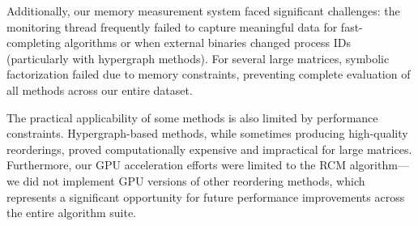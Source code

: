 Additionally, our memory measurement system faced significant challenges: the monitoring thread frequently failed to capture meaningful data for fast-completing algorithms or when external binaries changed process IDs (particularly with hypergraph methods). For several large matrices, symbolic factorization failed due to memory constraints, preventing complete evaluation of all methods across our entire dataset.

The practical applicability of some methods is also limited by performance constraints. Hypergraph-based methods, while sometimes producing high-quality reorderings, proved computationally expensive and impractical for large matrices. Furthermore, our GPU acceleration efforts were limited to the RCM algorithm—we did not implement GPU versions of other reordering methods, which represents a significant opportunity for future performance improvements across the entire algorithm suite.


